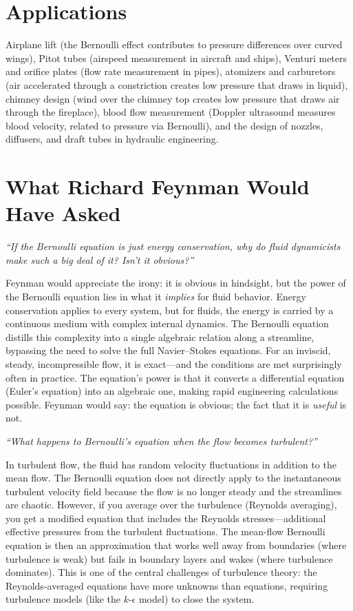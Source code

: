 \section*{Applications}

Airplane lift (the Bernoulli effect contributes to pressure differences over curved wings), Pitot tubes (airspeed measurement in aircraft and ships), Venturi meters and orifice plates (flow rate measurement in pipes), atomizers and carburetors (air accelerated through a constriction creates low pressure that draws in liquid), chimney design (wind over the chimney top creates low pressure that draws air through the fireplace), blood flow measurement (Doppler ultrasound measures blood velocity, related to pressure via Bernoulli), and the design of nozzles, diffusers, and draft tubes in hydraulic engineering.
\section*{What Richard Feynman Would Have Asked}

\textit{``If the Bernoulli equation is just energy conservation, why do fluid dynamicists make such a big deal of it? Isn't it obvious?''}

Feynman would appreciate the irony: it is obvious in hindsight, but the power of the Bernoulli equation lies in what it \emph{implies} for fluid behavior. Energy conservation applies to every system, but for fluids, the energy is carried by a continuous medium with complex internal dynamics. The Bernoulli equation distills this complexity into a single algebraic relation along a streamline, bypassing the need to solve the full Navier--Stokes equations. For an inviscid, steady, incompressible flow, it is exact---and the conditions are met surprisingly often in practice. The equation's power is that it converts a differential equation (Euler's equation) into an algebraic one, making rapid engineering calculations possible. Feynman would say: the equation is obvious; the fact that it is \emph{useful} is not.

\textit{``What happens to Bernoulli's equation when the flow becomes turbulent?''}

In turbulent flow, the fluid has random velocity fluctuations in addition to the mean flow. The Bernoulli equation does not directly apply to the instantaneous turbulent velocity field because the flow is no longer steady and the streamlines are chaotic. However, if you average over the turbulence (Reynolds averaging), you get a modified equation that includes the Reynolds stresses---additional effective pressures from the turbulent fluctuations. The mean-flow Bernoulli equation is then an approximation that works well away from boundaries (where turbulence is weak) but fails in boundary layers and wakes (where turbulence dominates). This is one of the central challenges of turbulence theory: the Reynolds-averaged equations have more unknowns than equations, requiring turbulence models (like the $k$-$\epsilon$ model) to close the system.

